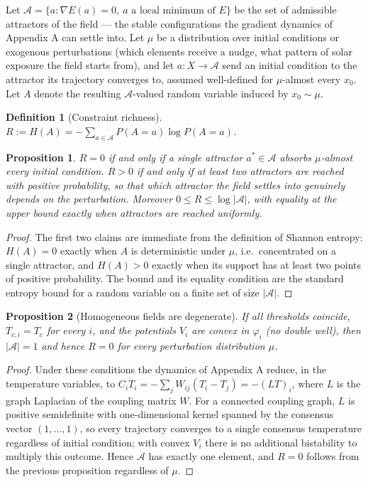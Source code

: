 \documentclass[11pt]{article}
\newtheorem{proposition}{Proposition}
\newtheorem{definition}{Definition}
\begin{document}
Let $\mathcal A = \{a : \nabla E(a) = 0,\ a \text{ a local minimum of } E\}$ be the set of admissible attractors of the field --- the stable configurations the gradient dynamics of Appendix A can settle into. Let $\mu$ be a distribution over initial conditions or exogenous perturbations (which elements receive a nudge, what pattern of solar exposure the field starts from), and let $a: X \to \mathcal A$ send an initial condition to the attractor its trajectory converges to, assumed well-defined for $\mu$-almost every $x_0$. Let $A$ denote the resulting $\mathcal A$-valued random variable induced by $x_0 \sim \mu$.

\begin{definition}[Constraint richness]
$R := H(A) = -\sum_{a \in \mathcal A} P(A=a) \log P(A=a)$.
\end{definition}

\begin{proposition}
$R = 0$ if and only if a single attractor $a^\ast \in \mathcal A$ absorbs $\mu$-almost every initial condition. $R > 0$ if and only if at least two attractors are reached with positive probability, so that which attractor the field settles into genuinely depends on the perturbation. Moreover $0 \le R \le \log|\mathcal A|$, with equality at the upper bound exactly when attractors are reached uniformly.
\end{proposition}

\begin{proof}
The first two claims are immediate from the definition of Shannon entropy: $H(A) = 0$ exactly when $A$ is deterministic under $\mu$, i.e.\ concentrated on a single attractor, and $H(A) > 0$ exactly when its support has at least two points of positive probability. The bound and its equality condition are the standard entropy bound for a random variable on a finite set of size $|\mathcal A|$.
\end{proof}

\begin{proposition}[Homogeneous fields are degenerate]
If all thresholds coincide, $T_{c,i} = T_c$ for every $i$, and the potentials $V_i$ are convex in $\varphi_i$ (no double well), then $|\mathcal A| = 1$ and hence $R = 0$ for every perturbation distribution $\mu$.
\end{proposition}

\begin{proof}
Under these conditions the dynamics of Appendix A reduce, in the temperature variables, to $C_i \dot T_i = -\sum_j W_{ij}(T_i - T_j) = -(LT)_i$, where $L$ is the graph Laplacian of the coupling matrix $W$. For a connected coupling graph, $L$ is positive semidefinite with one-dimensional kernel spanned by the consensus vector $(1,\ldots,1)$, so every trajectory converges to a single consensus temperature regardless of initial condition; with convex $V_i$ there is no additional bistability to multiply this outcome. Hence $\mathcal A$ has exactly one element, and $R = 0$ follows from the previous proposition regardless of $\mu$.
\end{proof}
\end{document}
